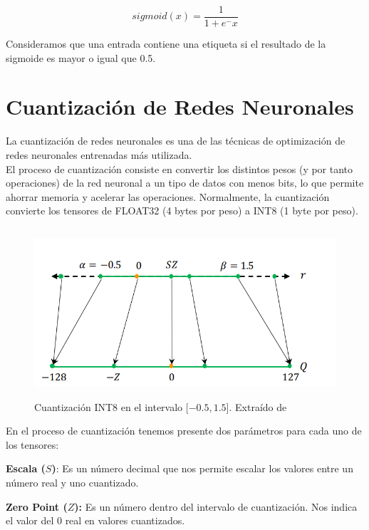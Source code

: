 \begin{equation}
    sigmoid(x) =  \frac{\mathrm{1} }{\mathrm{1} + e^-x }
    \label{eq:sigmoid}
\end{equation}    

Consideramos que una entrada contiene una etiqueta si el resultado de la sigmoide es mayor o igual que 0.5.


\hypertarget{cuantizacion-de-redes-neuronales}{%
\section{Cuantización de Redes
Neuronales}\label{cuantizacion-de-redes-neuronales}}

La cuantización de redes neuronales es una de las técnicas de
optimización de redes neuronales entrenadas más utilizada.\\
El proceso de cuantización consiste en convertir los distintos pesos (y
por tanto operaciones) de la red neuronal a un tipo de datos con menos
bits, lo que permite ahorrar memoria y acelerar las operaciones.
Normalmente, la cuantización convierte los tensores de FLOAT32 (4 bytes
por peso) a INT8 (1 byte por peso).

\begin{figure}
    \centering

    \includegraphics[width=5in,height=2.46875in]{img/3/quant.png}
    \caption{Cuantización INT8 en el intervalo $[-0.5,1.5$]. Extraído de \cite{quant_survey}}
    \label{fig:quant}
\end{figure}

En el proceso de cuantización tenemos presente dos parámetros para cada
uno de los tensores:

\textbf{Escala ($S$)}: Es un número decimal que nos permite escalar los
valores entre un número real y uno cuantizado.

\textbf{Zero Point ($Z$):} Es un número dentro del intervalo de cuantización.
Nos indica el valor del 0 real en valores cuantizados.

